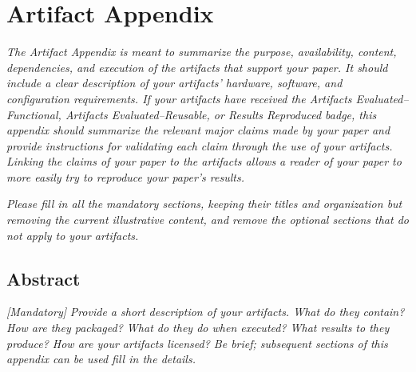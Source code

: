 %



\appendix

\section{Artifact Appendix}

\emph{The Artifact Appendix is meant to summarize the purpose,
availability, content, dependencies, and execution of the artifacts
that support your paper.  It should include a clear description of
your artifacts' hardware, software, and configuration requirements.
If your artifacts have received the \emph{Artifacts
Evaluated--Functional}, \emph{Artifacts Evaluated--Reusable}, or
\emph{Results Reproduced} badge, this appendix should summarize the
relevant major claims made by your paper and provide instructions for
validating each claim through the use of your artifacts.  Linking the
claims of your paper to the artifacts allows a reader of your paper
to more easily try to reproduce your paper's results.}

\emph{Please fill in all the mandatory sections, keeping their titles
and organization but removing the current illustrative content, and
remove the optional sections that do not apply to your artifacts.}


\subsection{Abstract}

\emph{[Mandatory]}
%
\emph{Provide a short description of your artifacts.  What do they
contain?  How are they packaged?  What do they do when executed?  What
results to they produce?  How are your artifacts licensed?  Be brief;
subsequent sections of this appendix can be used fill in the details.}

